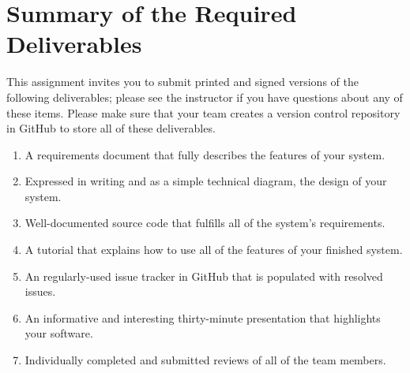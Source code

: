 
\section*{Summary of the Required Deliverables}

This assignment invites you to submit printed and signed versions of the following deliverables; please see the
instructor if you have questions about any of these items. Please make sure that your team creates a version control
repository in GitHub to store all of these deliverables.

\vspace*{-.1in}
\begin{enumerate}
  \setlength{\itemsep}{0in}
  \item A requirements document that fully describes the features of your system.
  \item Expressed in writing and as a simple technical diagram, the design of your system.
  \item Well-documented source code that fulfills all of the system's requirements.
  \item A tutorial that explains how to use all of the features of your finished system.
  \item An regularly-used issue tracker in GitHub that is populated with resolved issues.
  \item An informative and interesting thirty-minute presentation that highlights your software.
  \item Individually completed and submitted reviews of all of the team members.
\end{enumerate}
\vspace*{-.1in}



